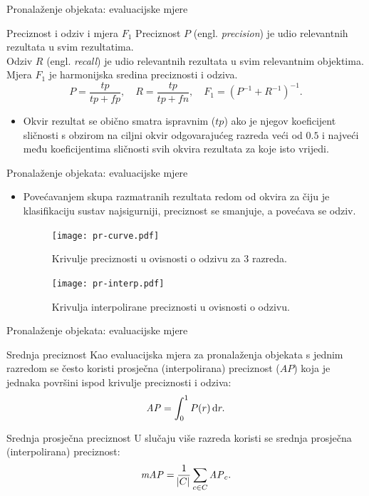 \documentclass{beamer}
\begin{document}
\begin{frame}{Pronalaženje objekata: evaluacijske mjere}
	\begin{block}{Preciznost i odziv i mjera $F_1$}
		Preciznost $P$ (engl. \emph{precision}) je udio relevantnih rezultata u svim rezultatima. \\
		Odziv $R$ (engl. \emph{recall}) je udio relevantnih rezultata u svim relevantnim objektima. \\		
		Mjera $F_1$ je harmonijska sredina preciznosti i odziva.
		$$
		P = \frac{\mathit{tp}}{\mathit{tp} + \mathit{fp}}, \quad
		R = \frac{\mathit{tp}}{\mathit{tp} + \mathit{fn}}, \quad
		F_1 = ({P^{-1}+R^{-1}})^{-1}.
		$$			
	\end{block}
	\begin{itemize}
		\item  Okvir rezultat se obično smatra ispravnim ($\mathit{tp}$) ako je njegov koeficijent sličnosti s obzirom na ciljni okvir odgovarajućeg razreda veći od $0.5$ i najveći među koeficijentima sličnosti svih okvira rezultata za koje isto vrijedi.
	\end{itemize}
\end{frame}

\begin{frame}{Pronalaženje objekata: evaluacijske mjere}
	\begin{itemize}
		\item Povećavanjem skupa razmatranih rezultata redom od okvira za čiju je klasifikaciju sustav najsigurniji, preciznost se smanjuje, a povećava se odziv.
	    \only<1> {
	    	\begin{figure}[ht] \centering 
	    		\texttt{[image: pr-curve.pdf]}
	    		\caption{Krivulje preciznosti u ovisnosti o odzivu za 3 razreda.}
	    		\label{fig:piramida}
	    	\end{figure}
	    }
	     {
			\begin{figure}[ht] \centering 
				\texttt{[image: pr-interp.pdf]}				
				\caption{Krivulja interpolirane preciznosti u ovisnosti o odzivu.}
				\label{fig:piramida}
			\end{figure}
        }			
	\end{itemize}
\end{frame}

\begin{frame}{Pronalaženje objekata: evaluacijske mjere}
	\begin{block}{Srednja preciznost}
		Kao evaluacijska mjera za pronalaženja objekata s jednim razredom se često koristi prosječna (interpolirana) preciznost ($\mathit{AP}$) koja je jednaka površini ispod krivulje preciznosti i odziva:
		$$
		\mathit{AP} = \int_{0}^{1} P(r) \dif r . 
		$$
	\end{block}
	\begin{block}{Srednja prosječna preciznost}	 
		U slučaju više razreda koristi se srednja prosječna (interpolirana) preciznost:
		$$
		\mathit{mAP} = \frac{1}{\abs C}\sum_{c \in C} \mathit{AP}_c .
		$$
	\end{block}
\end{frame}
\end{document}
